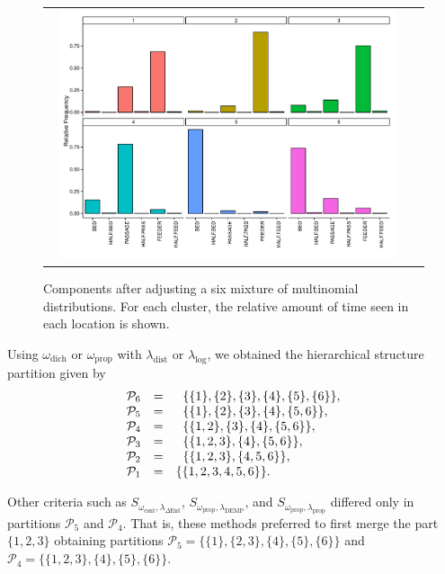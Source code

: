 \documentclass[submit]{smj}
\theoremstyle{definition}
\begin{document}
\begin{figure}[hpb]
\begin{center}
\begin{tabular}{cc}
  \includegraphics[width=0.95\textwidth]{figures/multinomial_mixt_all.pdf} \\
 \end{tabular}
 \caption{Components after adjusting a six mixture of multinomial distributions. For each cluster, the relative amount of time seen in each location is shown.}\label{multinomial_mixture}
\end{center}
\end{figure}

Using $\omega_{\text{dich}}$ or  $\omega_{\text{prop}}$ with $\lambda_{\text{dist}}$ or $\lambda_{\log}$, we obtained the hierarchical structure partition given by
\begin{equation}
\begin{array}{r c l}
 \mathcal{P}_6&=& \;\; \{\{1\},\{2\},\{3\},\{4\},\{5\},\{6\}\}, \\
 \mathcal{P}_5&=& \;\; \{\{1\},\{2\},\{3\},\{4\},\{5,6\}\}, \\ 
 \mathcal{P}_4&=& \;\; \{\{1,2\},\{3\},\{4\},\{5,6\}\}, \\ 
 \mathcal{P}_3&=& \;\; \{\{1,2,3\},\{4\},\{5,6\}\}, \\ 
 \mathcal{P}_2&=& \;\; \{\{1,2,3\},\{4,5,6\}\}, \\ 
 \mathcal{P}_1&=& \{\{1,2,3,4,5,6\}\}.
\end{array}
\label{hier_ex_multinomial}
\end{equation}

Other criteria such as $S_{\omega_{\text{csnt}},\lambda_{\Delta\text{Ent}}}$,  $S_{\omega_{\text{prop}},\lambda_{\text{DEMP}}}$,  and $S_{\omega_{\text{prop}},\lambda_{\text{prop}}}$ differed only in partitions $\mathcal{P}_5$ and $\mathcal{P}_4$.  That is, these methods preferred to first merge the part $\{1,2,3\}$ obtaining partitions $\mathcal{P}_5 = \{\{1\},\{2, 3\},\{4\},\{5\} ,\{6\}\}$ and $\mathcal{P}_4 = \{\{1,2,3\},\{4\},\{5\},\{6\}\}$.
\end{document}

